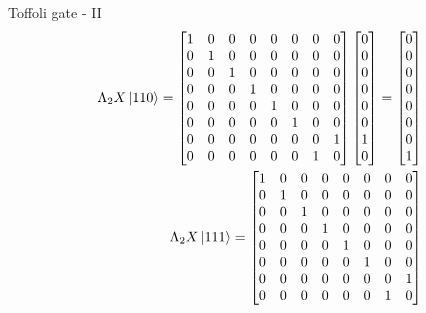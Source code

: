 \documentclass{beamer}
\begin{document}
\begin{frame}{Toffoli gate - II}
  {\tiny
    \begin{align*}
      \Lambda_2 X \ket{110}
      =
      \begin{bmatrix}
        1 & 0 & 0 & 0 & 0 & 0 & 0 & 0 \\
        0 & 1 & 0 & 0 & 0 & 0 & 0 & 0 \\
        0 & 0 & 1 & 0 & 0 & 0 & 0 & 0 \\
        0 & 0 & 0 & 1 & 0 & 0 & 0 & 0 \\
        0 & 0 & 0 & 0 & 1 & 0 & 0 & 0 \\
        0 & 0 & 0 & 0 & 0 & 1 & 0 & 0 \\
        0 & 0 & 0 & 0 & 0 & 0 & 0 & 1 \\
        0 & 0 & 0 & 0 & 0 & 0 & 1 & 0 \\
      \end{bmatrix}
      \begin{bmatrix} 
        0 \\ 0 \\ 0 \\ 0 \\ 0 \\ 0 \\ 1 \\ 0
      \end{bmatrix} 
      =
      \begin{bmatrix} 
        0 \\ 0 \\ 0 \\ 0 \\ 0 \\ 0 \\ 0 \\ 1
      \end{bmatrix} 
      \\
      \Lambda_2 X \ket{111}
      =
      \begin{bmatrix}
        1 & 0 & 0 & 0 & 0 & 0 & 0 & 0 \\
        0 & 1 & 0 & 0 & 0 & 0 & 0 & 0 \\
        0 & 0 & 1 & 0 & 0 & 0 & 0 & 0 \\
        0 & 0 & 0 & 1 & 0 & 0 & 0 & 0 \\
        0 & 0 & 0 & 0 & 1 & 0 & 0 & 0 \\
        0 & 0 & 0 & 0 & 0 & 1 & 0 & 0 \\
        0 & 0 & 0 & 0 & 0 & 0 & 0 & 1 \\
        0 & 0 & 0 & 0 & 0 & 0 & 1 & 0 \\

\end{bmatrix}
\end{align*}}
\end{frame}
\end{document}
